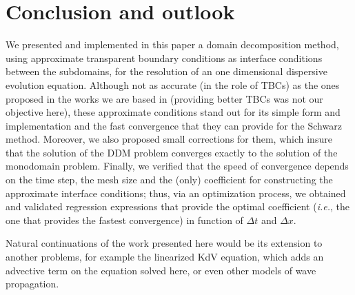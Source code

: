 \section{Conclusion and outlook}

\indent We presented and implemented in this paper a domain decomposition method, using approximate transparent boundary conditions as interface  conditions between the subdomains, for the resolution of an one dimensional dispersive evolution equation. Although not as accurate (in the role of TBCs) as the ones proposed in the works we are based in (providing better TBCs was not our objective here), these approximate conditions stand out for its simple form and implementation and the fast convergence that they can provide for the Schwarz method. Moreover, we also proposed small corrections for them, which insure that the solution of the DDM problem converges exactly to the solution of the monodomain problem. Finally, we verified that the speed of convergence depends on the time step, the mesh size and the (only) coefficient for constructing the approximate interface conditions; thus, via an optimization process, we obtained and validated regression expressions that provide the optimal coefficient (\emph{i.e.}, the one that provides the fastest convergence) in function of $\Delta t $ and $\Delta x$.

\indent Natural continuations of the work presented here would be its extension to another problems, for example the linearized KdV equation, which adds an advective term on the equation solved here, or even other models of wave propagation.